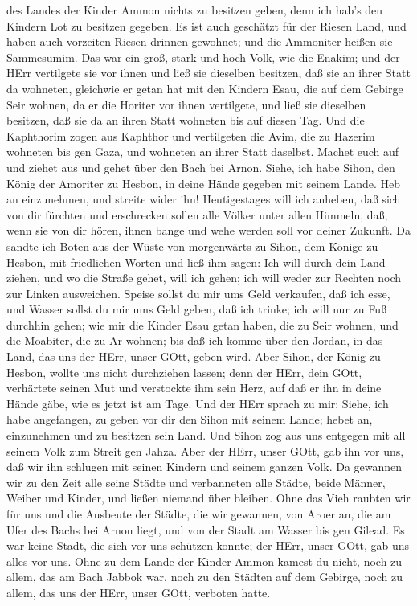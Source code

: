 des Landes der Kinder Ammon nichts zu besitzen geben, denn ich hab's den
Kindern Lot zu besitzen gegeben.  Es ist auch geschätzt für
der Riesen Land, und haben auch vorzeiten Riesen drinnen gewohnet; und
die Ammoniter heißen sie Sammesumim.  Das war ein groß,
stark und hoch Volk, wie die Enakim; und der HErr vertilgete sie vor
ihnen und ließ sie dieselben besitzen, daß sie an ihrer Statt da
wohneten,  gleichwie er getan hat mit den Kindern Esau, die
auf dem Gebirge Seir wohnen, da er die Horiter vor ihnen vertilgete, und
ließ sie dieselben besitzen, daß sie da an ihren Statt wohneten bis auf
diesen Tag.  Und die Kaphthorim zogen aus Kaphthor und
vertilgeten die Avim, die zu Hazerim wohneten bis gen Gaza, und wohneten
an ihrer Statt daselbst.  Machet euch auf und ziehet aus
und gehet über den Bach bei Arnon. Siehe, ich habe Sihon, den König der
Amoriter zu Hesbon, in deine Hände gegeben mit seinem Lande. Heb an
einzunehmen, und streite wider ihn!  Heutigestages will ich
anheben, daß sich von dir fürchten und erschrecken sollen alle Völker
unter allen Himmeln, daß, wenn sie von dir hören, ihnen bange und wehe
werden soll vor deiner Zukunft.  Da sandte ich Boten aus
der Wüste von morgenwärts zu Sihon, dem Könige zu Hesbon, mit
friedlichen Worten und ließ ihm sagen:  Ich will durch dein
Land ziehen, und wo die Straße gehet, will ich gehen; ich will weder zur
Rechten noch zur Linken ausweichen.  Speise sollst du mir
ums Geld verkaufen, daß ich esse, und Wasser sollst du mir ums Geld
geben, daß ich trinke; ich will nur zu Fuß durchhin gehen; 
wie mir die Kinder Esau getan haben, die zu Seir wohnen, und die
Moabiter, die zu Ar wohnen; bis daß ich komme über den Jordan, in das
Land, das uns der HErr, unser GOtt, geben wird.  Aber
Sihon, der König zu Hesbon, wollte uns nicht durchziehen lassen; denn
der HErr, dein GOtt, verhärtete seinen Mut und verstockte ihm sein Herz,
auf daß er ihn in deine Hände gäbe, wie es jetzt ist am Tage.
 Und der HErr sprach zu mir: Siehe, ich habe angefangen, zu
geben vor dir den Sihon mit seinem Lande; hebet an, einzunehmen und zu
besitzen sein Land.  Und Sihon zog aus uns entgegen mit all
seinem Volk zum Streit gen Jahza.  Aber der HErr, unser
GOtt, gab ihn vor uns, daß wir ihn schlugen mit seinen Kindern und
seinem ganzen Volk.  Da gewannen wir zu den Zeit alle seine
Städte und verbanneten alle Städte, beide Männer, Weiber und Kinder, und
ließen niemand über bleiben.  Ohne das Vieh raubten wir für
uns und die Ausbeute der Städte, die wir gewannen,  von
Aroer an, die am Ufer des Bachs bei Arnon liegt, und von der Stadt am
Wasser bis gen Gilead. Es war keine Stadt, die sich vor uns schützen
konnte; der HErr, unser GOtt, gab uns alles vor uns.  Ohne
zu dem Lande der Kinder Ammon kamest du nicht, noch zu allem, das am
Bach Jabbok war, noch zu den Städten auf dem Gebirge, noch zu allem, das
uns der HErr, unser GOtt, verboten hatte.

